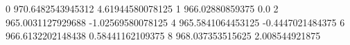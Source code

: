 0 970.6482543945312 4.61944580078125
1 966.02880859375 0.0
2 965.0031127929688 -1.02569580078125
4 965.5841064453125 -0.4447021484375
6 966.6132202148438 0.58441162109375
8 968.037353515625 2.008544921875
